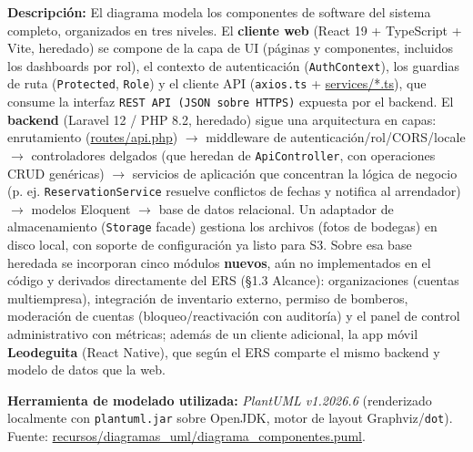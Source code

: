 \noindent\textbf{Descripción:} El diagrama modela los componentes de software del sistema completo, organizados en tres niveles. El \textbf{cliente web} (React 19 + TypeScript + Vite, heredado) se compone de la capa de UI (páginas y componentes, incluidos los dashboards por rol), el contexto de autenticación (\texttt{AuthContext}), los guardias de ruta (\texttt{Protected}, \texttt{Role}) y el cliente API (\texttt{axios.ts} + \url{services/*.ts}), que consume la interfaz \texttt{REST API (JSON sobre HTTPS)} expuesta por el backend. El \textbf{backend} (Laravel 12 / PHP 8.2, heredado) sigue una arquitectura en capas: enrutamiento (\url{routes/api.php}) $\rightarrow$ middleware de autenticación/rol/CORS/locale $\rightarrow$ controladores delgados (que heredan de \texttt{ApiController}, con operaciones CRUD genéricas) $\rightarrow$ servicios de aplicación que concentran la lógica de negocio (p. ej. \texttt{ReservationService} resuelve conflictos de fechas y notifica al arrendador) $\rightarrow$ modelos Eloquent $\rightarrow$ base de datos relacional. Un adaptador de almacenamiento (\texttt{Storage} facade) gestiona los archivos (fotos de bodegas) en disco local, con soporte de configuración ya listo para S3. Sobre esa base heredada se incorporan cinco módulos \textbf{nuevos}, aún no implementados en el código y derivados directamente del ERS (\S1.3 Alcance): organizaciones (cuentas multiempresa), integración de inventario externo, permiso de bomberos, moderación de cuentas (bloqueo/reactivación con auditoría) y el panel de control administrativo con métricas; además de un cliente adicional, la app móvil \textbf{Leodeguita} (React Native), que según el ERS comparte el mismo backend y modelo de datos que la web.

\bigskip
{\sloppy\noindent\textbf{Herramienta de modelado utilizada:} \textit{PlantUML v1.2026.6} (renderizado localmente con \texttt{plantuml.jar} sobre OpenJDK, motor de layout Graphviz/\texttt{dot}). Fuente: \url{recursos/diagramas_uml/diagrama_componentes.puml}.\par}


